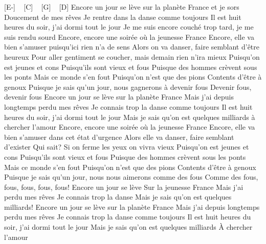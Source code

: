 
[E-] ~ [C] ~ [G] ~ [D]
Encore un jour se lève sur la planète France et je sors
Doucement de mes rêves
Je rentre dans la danse comme toujours
Il est huit heures du soir, j'ai dormi tout le jour
Je me suis encore couché trop tard, je me suis rendu sourd
Encore, encore une soirée où la jeunesse France
Encore, elle va bien s'amuser puisqu'ici rien n'a de sens
Alors on va danser, faire semblant d'être heureux
Pour aller gentiment se coucher, mais demain rien n'ira mieux
Puisqu'on est jeunes et cons
Puisqu'ils sont vieux et fous
Puisque des hommes crèvent sous les ponts
Mais ce monde s'en fout
Puisqu'on n'est que des pions
Contents d'être à genoux
Puisque je sais qu'un jour, nous gagnerons à devenir fous
Devenir fous, devenir fous
Encore un jour se lève sur la planète France
Mais j'ai depuis longtemps perdu mes rêves
Je connais trop la danse comme toujours
Il est huit heures du soir, j'ai dormi tout le jour
Mais je sais qu'on est quelques milliards à chercher l'amour
Encore, encore une soirée où la jeunesse France
Encore, elle va bien s'amuser dans cet état d'urgence
Alors elle va danser, faire semblant d'exister
Qui sait? Si on ferme les yeux on vivra vieux
Puisqu'on est jeunes et cons
Puisqu'ils sont vieux et fous
Puisque des hommes crèvent sous les ponts
Mais ce monde s'en fout
Puisqu'on n'est que des pions
Contents d'être à genoux
Puisque je sais qu'un jour, nous nous aimerons comme des fous
Comme des fous, fous, fous, fous, fous!
Encore un jour se lève
Sur la jeunesse France
Mais j'ai perdu mes rêves
Je connais trop la danse
Mais je sais qu'on est quelques milliards!
Encore un jour se lève sur la planète France
Mais j'ai depuis longtemps perdu mes rêves
Je connais trop la danse comme toujours
Il est huit heures du soir, j'ai dormi tout le jour
Mais je sais qu'on est quelques milliards
À chercher l'amour